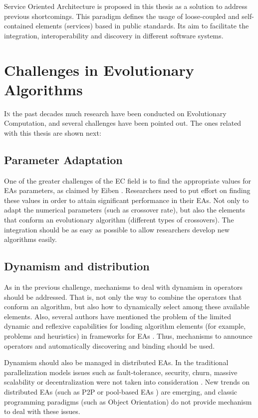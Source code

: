 Service Oriented Architecture \cite{Papazoglou2007SOA} is proposed in
this thesis as a solution to address previous shortcomings. This
paradigm defines the usage of loose-coupled and self-contained
elements (services) based in public standards. Its aim to facilitate
the integration, interoperability and discovery in different software
systems. 


\section{Challenges in Evolutionary Algorithms}
\label{sec:intro:challenges}

\lettrine{I}{n} the past decades much research have been conducted on Evolutionary Computation, and several challenges have been pointed out. The ones related with this thesis are shown next:

\subsection{Parameter Adaptation}

One of the greater challenges of the EC field is to find the appropriate values for EAs parameters, as claimed by {\person Eiben \etal} 
\cite{Eiben12Parameters}. Researchers need to put effort on finding these values in order to
attain significant performance in their EAs. Not only to adapt the numerical parameters (such as crossover rate), but also the elements that conform an evolutionary algorithm (different types of crossovers). The integration should be as easy as possible to allow researchers develop new algorithms easily. 

\subsection{Dynamism and distribution}
As in the previous challenge, mechanisms to deal with dynamism in operators should be addressed. That is, not only the way to combine the operators that conform an algorithm, but also how to dynamically select among these available elements. Also, several authors have mentioned the problem of the limited dynamic and reflexive capabilities for loading algorithm elements (for example, problems and heuristics) in frameworks for EAs \cite{SURVEYMOFS}. Thus, mechanisms to announce operators and automatically discovering and binding should be used.

Dynamism should also be managed in distributed EAs. In the traditional parallelization models \cite{alba2002parallelism} issues such as fault-tolerance, security, churn, massive scalability or decentralization were not taken into consideration \cite{Alba13parallel}. New trends on distributed EAs (such as P2P \cite{laredo2010evag} or pool-based EAs \cite{merelo2012pool}) are emerging,  and classic programming paradigms (such as Object Orientation) do not provide mechanism to deal with these issues.


